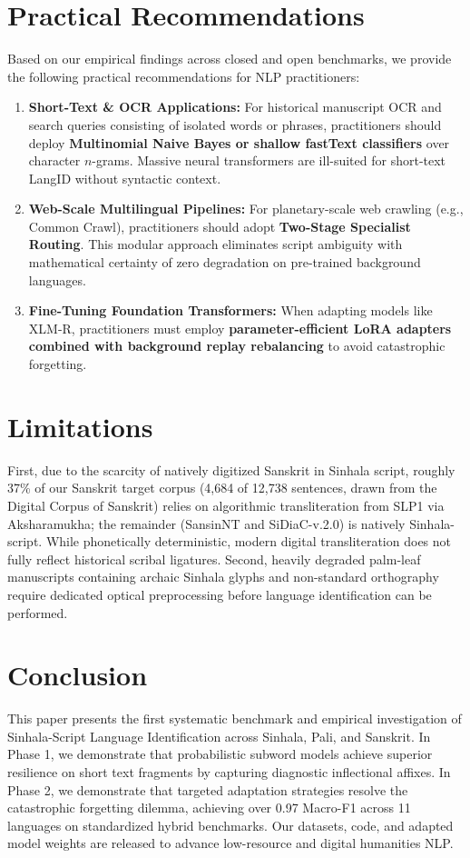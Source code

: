 \documentclass[11pt]{article}
\begin{document}
\section{Practical Recommendations}
Based on our empirical findings across closed and open benchmarks, we provide the following practical recommendations for NLP practitioners:
\begin{enumerate}
    \item \textbf{Short-Text \& OCR Applications:} For historical manuscript OCR and search queries consisting of isolated words or phrases, practitioners should deploy \textbf{Multinomial Naive Bayes or shallow fastText classifiers} over character $n$-grams. Massive neural transformers are ill-suited for short-text LangID without syntactic context.
    \item \textbf{Web-Scale Multilingual Pipelines:} For planetary-scale web crawling (e.g., Common Crawl), practitioners should adopt \textbf{Two-Stage Specialist Routing}. This modular approach eliminates script ambiguity with mathematical certainty of zero degradation on pre-trained background languages.
    \item \textbf{Fine-Tuning Foundation Transformers:} When adapting models like XLM-R, practitioners must employ \textbf{parameter-efficient LoRA adapters combined with background replay rebalancing} to avoid catastrophic forgetting.
\end{enumerate}

\section{Limitations}
First, due to the scarcity of natively digitized Sanskrit in Sinhala script, roughly 37\% of our Sanskrit target corpus (4,684 of 12,738 sentences, drawn from the Digital Corpus of Sanskrit) relies on algorithmic transliteration from SLP1 via Aksharamukha; the remainder (SansinNT and SiDiaC-v.2.0) is natively Sinhala-script. While phonetically deterministic, modern digital transliteration does not fully reflect historical scribal ligatures. Second, heavily degraded palm-leaf manuscripts containing archaic Sinhala glyphs and non-standard orthography require dedicated optical preprocessing before language identification can be performed.

\section{Conclusion}
This paper presents the first systematic benchmark and empirical investigation of Sinhala-Script Language Identification across Sinhala, Pali, and Sanskrit. In Phase 1, we demonstrate that probabilistic subword models achieve superior resilience on short text fragments by capturing diagnostic inflectional affixes. In Phase 2, we demonstrate that targeted adaptation strategies resolve the catastrophic forgetting dilemma, achieving over 0.97 Macro-F1 across 11 languages on standardized hybrid benchmarks. Our datasets, code, and adapted model weights are released to advance low-resource and digital humanities NLP.
\end{document}

